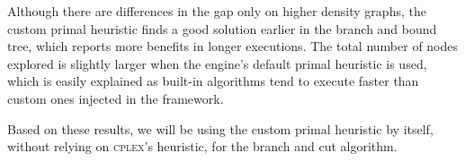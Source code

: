 Although there are differences in the gap only on higher density graphs, the custom primal heuristic finds a good solution earlier in the branch and bound tree, which reports more benefits in longer executions. The total number of nodes explored is slightly larger when the engine's default primal heuristic is used, which is easily explained as built-in algorithms tend to execute faster than custom ones injected in the framework.

Based on these results, we will be using the custom primal heuristic by itself, without relying on \textsc{cplex}'s heuristic, for the branch and cut algorithm.